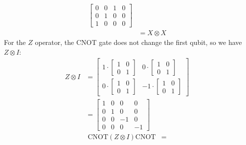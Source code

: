 \begin{examplebox}
\begin{equation}
\begin{aligned}
\begin{bmatrix}
                0 & 0 & 1 & 0 \\
                0 & 1 & 0 & 0 \\
                1 & 0 & 0 & 0
            \end{bmatrix} \\
            &=
            X \otimes X
        \end{aligned}
    \end{equation}
    For the $Z$ operator, the CNOT gate does not change the first qubit, so we have $Z \otimes I$:
    \begin{equation*}
        \begin{aligned}
            Z \otimes I &=
            \begin{bmatrix}
                1 \cdot \begin{bmatrix}
                    1 & 0 \\
                    0 & 1
                \end{bmatrix} &
                0 \cdot \begin{bmatrix}
                    1 & 0 \\
                    0 & 1
                \end{bmatrix} \\
                0 \cdot \begin{bmatrix}
                    1 & 0 \\
                    0 & 1
                \end{bmatrix} &
                -1 \cdot \begin{bmatrix}
                    1 & 0 \\
                    0 & 1
                \end{bmatrix}
            \end{bmatrix} \\
            &=
            \begin{bmatrix}
                1 & 0 & 0 & 0 \\
                0 & 1 & 0 & 0 \\
                0 & 0 & -1 & 0 \\
                0 & 0 & 0 & -1
            \end{bmatrix}
        \end{aligned}
    \end{equation*}
    \begin{equation}
        \begin{aligned}
            \text{CNOT} (Z \otimes I) \text{CNOT} &=

\end{aligned}
\end{equation}
\end{examplebox}
